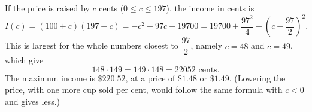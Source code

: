 If the price is raised by $c$ cents ($0\le c\le197$), the income in cents is
\[I(c)=(100+c)(197-c)=-c^2+97c+19700=19700+\dfrac{97^2}{4}-\left(c-\dfrac{97}{2}\right)^2.\]
This is largest for the whole numbers closest to $\dfrac{97}{2}$, namely $c=48$ and $c=49$, which give
\[148\cdot149=149\cdot148=22052\text{ cents}.\]
The maximum income is $\boxed{\$220.52}$, at a price of $\$1.48$ or $\$1.49$. (Lowering the price, with one more cup sold per cent, would follow the same formula with $c<0$ and gives less.)

